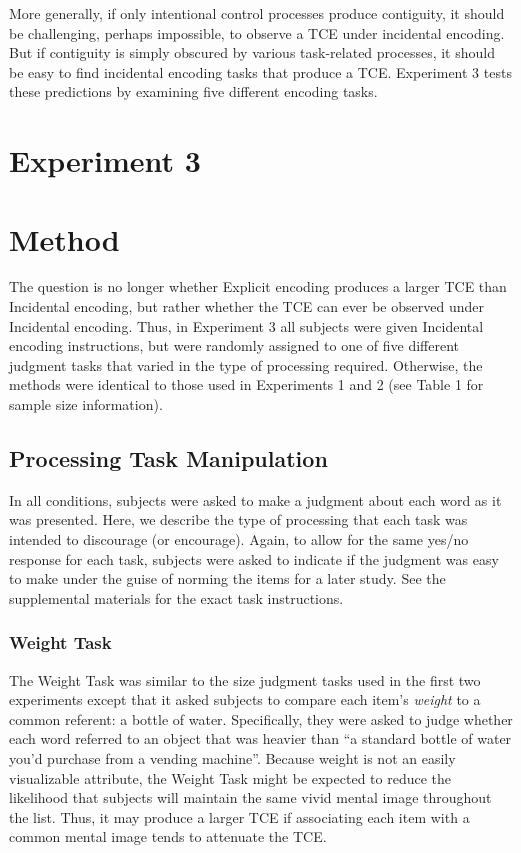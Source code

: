 \documentclass[jou,natbib,floatsintext]{apa6} %
\begin{document}
More generally, if only intentional control processes produce contiguity, it should be challenging, perhaps impossible, to observe a TCE under incidental encoding. But if contiguity is simply obscured by various task-related processes, it should be easy to find incidental encoding tasks that produce a TCE. Experiment 3 tests these predictions by examining five different encoding tasks.

\section{Experiment 3}
\section{Method}
The question is no longer whether Explicit encoding produces a larger TCE than Incidental encoding, but rather whether the TCE can ever be observed under Incidental encoding. Thus, in Experiment 3 all subjects were given Incidental encoding instructions, but were randomly assigned to one of five different judgment tasks that varied in the type of processing required. Otherwise, the methods were identical to those used in Experiments 1 and 2 (see Table 1 for sample size information).

\subsection{Processing Task Manipulation}
In all conditions, subjects were asked to make a judgment about each word as it was presented. Here, we describe the type of processing that each task was intended to discourage (or encourage). Again, to allow for the same yes/no response for each task, subjects were asked to indicate if the judgment was easy to make under the guise of norming the items for a later study. See the supplemental materials for the exact task instructions.

\subsubsection{Weight Task} The Weight Task was similar to the size judgment tasks used in the first two experiments except that it asked subjects to compare each item's \emph{weight} to a common referent: a bottle of water. Specifically, they were asked to judge whether each word referred to an object that was heavier than ``a standard bottle of water you'd purchase from a vending machine''. Because weight is not an easily visualizable attribute, the Weight Task might be expected to reduce the likelihood that subjects will maintain the same vivid mental image throughout the list. Thus, it may produce a larger TCE if associating each item with a common mental image tends to attenuate the TCE.
\end{document}
